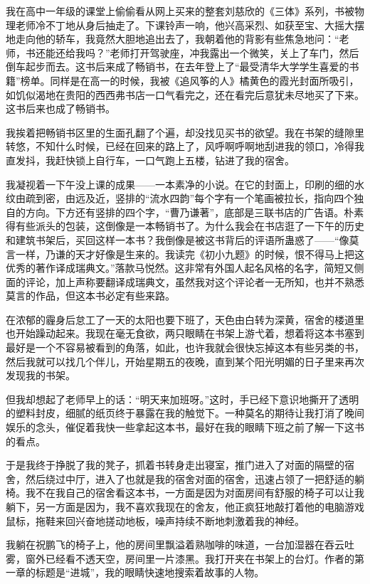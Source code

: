 \documentclass[openany,scheme = chinese, linespread = 1.5]{ctexbook}
\begin{document}
我在高中一年级的课堂上偷偷看从网上买来的整套刘慈欣的《三体》系列，书被物理老师冷不丁地从身后抽走了。下课铃声一响，他兴高采烈、如获至宝、大摇大摆地走向他的轿车，我竟然大胆地追出去了，我朝着他的背影有些焦急地问：“老师，书还能还给我吗？”老师打开驾驶座，冲我露出一个微笑，关上了车门，然后倒车起步而去。这书后来成了畅销书，在去年登上了“最受清华大学学生喜爱的书籍”榜单。同样是在高一的时候，我被《追风筝的人》橘黄色的霞光封面所吸引，如饥似渴地在贵阳的西西弗书店一口气看完之，还在看完后意犹未尽地买了下来。这书后来也成了畅销书。

我挨着把畅销书区里的生面孔翻了个遍，却没找见买书的欲望。我在书架的缝隙里转悠，不知什么时候，已经在回来的路上了，风呼啊呼啊地刮进我的领口，冷得我直发抖，我赶快锁上自行车，一口气跑上五楼，钻进了我的宿舍。

我凝视着一下午没上课的成果——一本素净的小说。在它的封面上，印刷的细的水纹由疏到密，由远及近，竖排的“流水四韵”每个字有一个笔画被拉长，指向四个独自的方向。下方还有竖排的四个字，“曹乃谦著”，底部是三联书店的广告语。朴素得有些派头的包装，这倒像是一本畅销书了。为什么我会在书店逛了一下午的历史和建筑书架后，买回这样一本书？我倒像是被这书背后的评语所蛊惑了——“像莫言一样，乃谦的天才好像是生来的。我读完《初小九题》的时候，恨不得马上把这优秀的著作译成瑞典文。”落款马悦然。这非常有外国人起名风格的名字，简短又侧面的评论，加上声称要翻译成瑞典文，虽然我对这个评论者一无所知，也并不熟悉莫言的作品，但这本书必定有些来路。

在浓郁的霾身后怠工了一天的太阳也要下班了，天色由白转为深黄，宿舍的楼道里也开始躁动起来。我现在毫无食欲，两只眼睛在书架上游弋着，想着将这本书塞到最好是一个不容易被看到的角落，如此，也许我就会很快忘掉这本有些另类的书，然后我就可以找几个伴儿，开始星期五的夜晚，直到某个阳光明媚的日子里来再次发现我的书架。

但我却想起了老师早上的话：“明天来加班呀。”这时，手已经下意识地撕开了透明的塑料封皮，细腻的纸页终于暴露在我的触觉下。一种莫名的期待让我打消了晚间娱乐的念头，催促着我快一些拿起这本书，最好在我的眼睛下班之前了解一下这书的看点。

于是我终于挣脱了我的凳子，抓着书转身走出寝室，推门进入了对面的隔壁的宿舍，然后绕过中厅，进入了也就是我的宿舍对面的宿舍，迅速占领了一把舒适的躺椅。我不在我自己的宿舍看这本书，一方面是因为对面房间有舒服的椅子可以让我躺下，另一方面是因为，我不喜欢我现在的舍友，他正疯狂地敲打着他的电脑游戏鼠标，拖鞋来回兴奋地搓动地板，噪声持续不断地刺激着我的神经。

我躺在祝鹏飞的椅子上，他的房间里飘溢着熟咖啡的味道，一台加湿器在吞云吐雾，窗外已经看不透天空，房间里一片漆黑。我打开夹在书架上的台灯。作者的第一章的标题是“进城”，我的眼睛快速地搜索着故事的人物。
\end{document}
